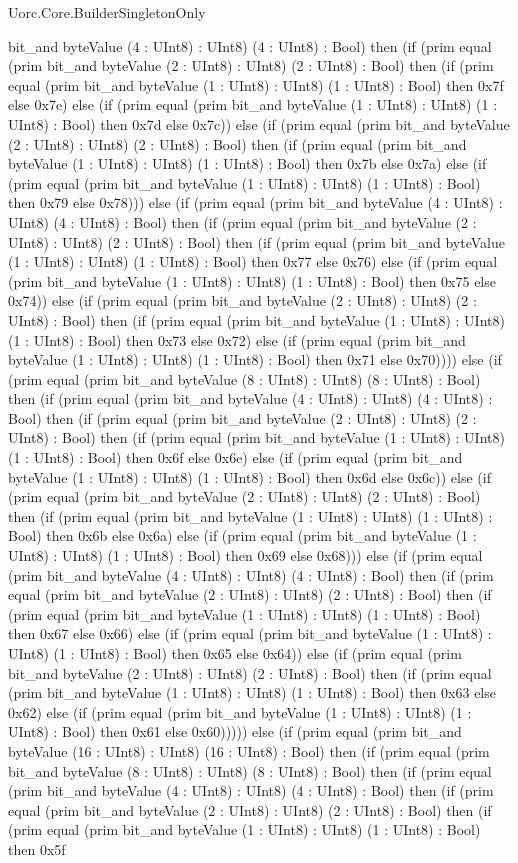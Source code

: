 \begin{lexlean}{Uorc.Core.BuilderSingletonOnly}
\begin{semanticmodule}
{bit_and byteValue (4 : UInt8) : UInt8) (4 : UInt8) : Bool) then (if (prim equal (prim bit_and byteValue (2 : UInt8) : UInt8) (2 : UInt8) : Bool) then (if (prim equal (prim bit_and byteValue (1 : UInt8) : UInt8) (1 : UInt8) : Bool) then 0x7f else 0x7e) else (if (prim equal (prim bit_and byteValue (1 : UInt8) : UInt8) (1 : UInt8) : Bool) then 0x7d else 0x7c)) else (if (prim equal (prim bit_and byteValue (2 : UInt8) : UInt8) (2 : UInt8) : Bool) then (if (prim equal (prim bit_and byteValue (1 : UInt8) : UInt8) (1 : UInt8) : Bool) then 0x7b else 0x7a) else (if (prim equal (prim bit_and byteValue (1 : UInt8) : UInt8) (1 : UInt8) : Bool) then 0x79 else 0x78))) else (if (prim equal (prim bit_and byteValue (4 : UInt8) : UInt8) (4 : UInt8) : Bool) then (if (prim equal (prim bit_and byteValue (2 : UInt8) : UInt8) (2 : UInt8) : Bool) then (if (prim equal (prim bit_and byteValue (1 : UInt8) : UInt8) (1 : UInt8) : Bool) then 0x77 else 0x76) else (if (prim equal (prim bit_and byteValue (1 : UInt8) : UInt8) (1 : UInt8) : Bool) then 0x75 else 0x74)) else (if (prim equal (prim bit_and byteValue (2 : UInt8) : UInt8) (2 : UInt8) : Bool) then (if (prim equal (prim bit_and byteValue (1 : UInt8) : UInt8) (1 : UInt8) : Bool) then 0x73 else 0x72) else (if (prim equal (prim bit_and byteValue (1 : UInt8) : UInt8) (1 : UInt8) : Bool) then 0x71 else 0x70)))) else (if (prim equal (prim bit_and byteValue (8 : UInt8) : UInt8) (8 : UInt8) : Bool) then (if (prim equal (prim bit_and byteValue (4 : UInt8) : UInt8) (4 : UInt8) : Bool) then (if (prim equal (prim bit_and byteValue (2 : UInt8) : UInt8) (2 : UInt8) : Bool) then (if (prim equal (prim bit_and byteValue (1 : UInt8) : UInt8) (1 : UInt8) : Bool) then 0x6f else 0x6e) else (if (prim equal (prim bit_and byteValue (1 : UInt8) : UInt8) (1 : UInt8) : Bool) then 0x6d else 0x6c)) else (if (prim equal (prim bit_and byteValue (2 : UInt8) : UInt8) (2 : UInt8) : Bool) then (if (prim equal (prim bit_and byteValue (1 : UInt8) : UInt8) (1 : UInt8) : Bool) then 0x6b else 0x6a) else (if (prim equal (prim bit_and byteValue (1 : UInt8) : UInt8) (1 : UInt8) : Bool) then 0x69 else 0x68))) else (if (prim equal (prim bit_and byteValue (4 : UInt8) : UInt8) (4 : UInt8) : Bool) then (if (prim equal (prim bit_and byteValue (2 : UInt8) : UInt8) (2 : UInt8) : Bool) then (if (prim equal (prim bit_and byteValue (1 : UInt8) : UInt8) (1 : UInt8) : Bool) then 0x67 else 0x66) else (if (prim equal (prim bit_and byteValue (1 : UInt8) : UInt8) (1 : UInt8) : Bool) then 0x65 else 0x64)) else (if (prim equal (prim bit_and byteValue (2 : UInt8) : UInt8) (2 : UInt8) : Bool) then (if (prim equal (prim bit_and byteValue (1 : UInt8) : UInt8) (1 : UInt8) : Bool) then 0x63 else 0x62) else (if (prim equal (prim bit_and byteValue (1 : UInt8) : UInt8) (1 : UInt8) : Bool) then 0x61 else 0x60))))) else (if (prim equal (prim bit_and byteValue (16 : UInt8) : UInt8) (16 : UInt8) : Bool) then (if (prim equal (prim bit_and byteValue (8 : UInt8) : UInt8) (8 : UInt8) : Bool) then (if (prim equal (prim bit_and byteValue (4 : UInt8) : UInt8) (4 : UInt8) : Bool) then (if (prim equal (prim bit_and byteValue (2 : UInt8) : UInt8) (2 : UInt8) : Bool) then (if (prim equal (prim bit_and byteValue (1 : UInt8) : UInt8) (1 : UInt8) : Bool) then 0x5f }
\end{semanticmodule}
\end{lexlean}
